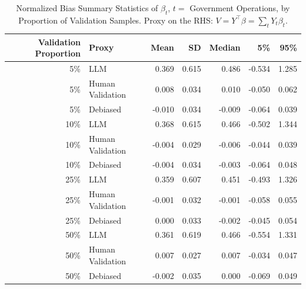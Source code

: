 \begin{table}

\caption{Normalized Bias Summary Statistics of $\beta_{t}$, $t=$ Government Operations, by Proportion of Validation Samples.
      Proxy on the RHS: $V = Y^\top \beta = \sum_{t} Y_t \beta_t$.}
\centering
\begin{tabular}[t]{rlrrrrr}
\toprule
Validation Proportion & Proxy & Mean & SD & Median & 5\% & 95\%\\
\midrule
5\% & LLM & 0.369 & 0.615 & 0.486 & -0.534 & 1.285\\
5\% & Human Validation & 0.008 & 0.034 & 0.010 & -0.050 & 0.062\\
5\% & Debiased & -0.010 & 0.034 & -0.009 & -0.064 & 0.039\\
10\% & LLM & 0.368 & 0.615 & 0.466 & -0.502 & 1.344\\
10\% & Human Validation & -0.004 & 0.029 & -0.006 & -0.044 & 0.039\\
10\% & Debiased & -0.004 & 0.034 & -0.003 & -0.064 & 0.048\\
25\% & LLM & 0.359 & 0.607 & 0.451 & -0.493 & 1.326\\
25\% & Human Validation & -0.001 & 0.032 & -0.001 & -0.058 & 0.055\\
25\% & Debiased & 0.000 & 0.033 & -0.002 & -0.045 & 0.054\\
50\% & LLM & 0.361 & 0.619 & 0.466 & -0.554 & 1.331\\
50\% & Human Validation & 0.007 & 0.027 & 0.007 & -0.034 & 0.047\\
50\% & Debiased & -0.002 & 0.035 & 0.000 & -0.069 & 0.049\\
\bottomrule
\end{tabular}
\end{table}

